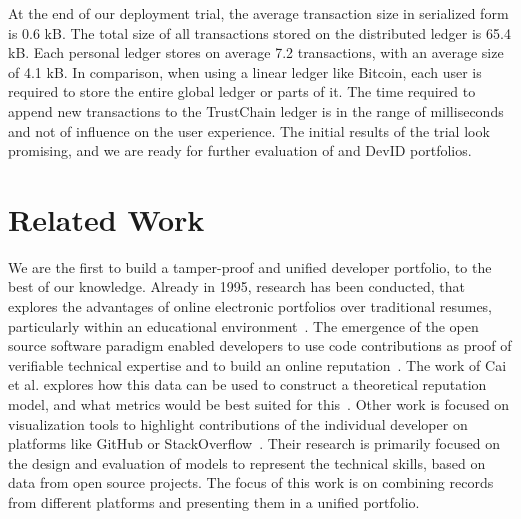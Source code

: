 At the end of our deployment trial, the average transaction size in serialized form is 0.6 kB.
The total size of all transactions stored on the distributed ledger is 65.4 kB.
Each personal ledger stores on average 7.2 transactions, with an average size of 4.1 kB.
In comparison, when using a linear ledger like Bitcoin, each user is required to store the entire global ledger or parts of it.  
The time required to append new transactions to the TrustChain ledger is in the range of milliseconds and not of influence on the user experience.
The initial results of the trial look promising, and we are ready for further evaluation of \Dappcoder{} and DevID portfolios. 

\section{Related Work}
We are the first to build a tamper-proof and unified developer portfolio, to the best of our knowledge.
Already in 1995, research has been conducted, that explores the advantages of online electronic portfolios over traditional resumes, particularly within an educational environment~\cite{riggsby1995electronic,barrett1999electronic}.
The emergence of the open source software paradigm enabled developers to use code contributions as proof of verifiable technical expertise and to build an online reputation~\cite{riehle2015open}.
The work of Cai et al. explores how this data can be used to construct a theoretical reputation model, and what metrics would be best suited for this~\cite{cai2016reputation}.
Other work is focused on visualization tools to highlight contributions of the individual developer on platforms like GitHub or StackOverflow~\cite{jaruchotrattanasakul2016open,saxena2017know,chen2016supporting}.
Their research is primarily focused on the design and evaluation of models to represent the technical skills, based on data from open source projects.
The focus of this work is on combining records from different platforms and presenting them in a unified portfolio.

